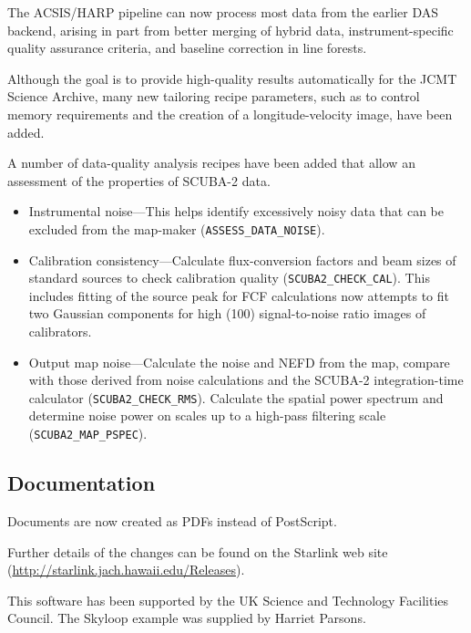 \documentclass[11pt,twoside]{article}
\begin{document}
The ACSIS/HARP pipeline can now process most data from the earlier DAS
backend, arising in part from better merging of hybrid data,
instrument-specific quality assurance criteria, and baseline
correction in line forests.

Although the goal is to provide high-quality results automatically for
the JCMT Science Archive, many new tailoring recipe parameters, such
as to control memory requirements and the creation of a
longitude-velocity image, have been added.


A number of data-quality analysis recipes have been added that allow
an assessment of the properties of SCUBA-2 data.
\begin{itemize}
\item Instrumental noise---This helps identify excessively noisy data that
can be excluded from the map-maker (\texttt{ASSESS\_DATA\_NOISE}).
\item Calibration consistency---Calculate flux-conversion factors and beam
sizes of standard sources to check calibration quality
(\texttt{SCUBA2\_CHECK\_CAL}).  This includes fitting of the source peak
for FCF calculations now attempts to fit two Gaussian components for high
(100) signal-to-noise ratio images of calibrators.
\item Output map noise---Calculate the noise and NEFD from the map,
compare with those derived from noise calculations and the SCUBA-2
integration-time calculator (\texttt{SCUBA2\_CHECK\_RMS}).  Calculate
the spatial power spectrum and determine noise power on scales up to a
high-pass filtering scale (\texttt{SCUBA2\_MAP\_PSPEC}).
\end{itemize}

\subsection*{Documentation}

Documents are now created as PDFs instead of PostScript.

\medskip
Further details of the changes can be found on the Starlink
web site\newline
(\url{http://starlink.jach.hawaii.edu/Releases}).

\acknowledgments This software has been supported by the UK Science
and Technology Facilities Council.  The Skyloop example was supplied
by Harriet Parsons.


\end{document}
